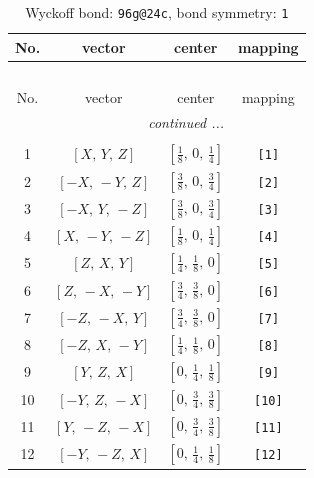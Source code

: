 \documentclass[fleqn,8pt]{jsarticle}
\begin{document}
\begin{longtable}{cccc}
\caption{Wyckoff bond: {\tt 96g@24c}, bond symmetry: {\tt 1}}
 \\
 \hline \hline
No. & vector & center & mapping \\ \hline \endfirsthead

\multicolumn{3}{l}{\tablename\ \thetable{}} \\
 \hline \hline
No. & vector & center & mapping \\ \hline \endhead

 \hline \hline
\multicolumn{3}{r}{\footnotesize\it continued ...} \\ \endfoot

 \hline \hline
\multicolumn{3}{r}{} \\ \endlastfoot

1 & $\left[ X,\, Y,\, Z \right]$ & $\left[ \frac{1}{8},\, 0,\, \frac{1}{4} \right]$ & {\tt [1]} \\ \hline
2 & $\left[ - X,\, - Y,\, Z \right]$ & $\left[ \frac{3}{8},\, 0,\, \frac{3}{4} \right]$ & {\tt [2]} \\ \hline
3 & $\left[ - X,\, Y,\, - Z \right]$ & $\left[ \frac{3}{8},\, 0,\, \frac{3}{4} \right]$ & {\tt [3]} \\ \hline
4 & $\left[ X,\, - Y,\, - Z \right]$ & $\left[ \frac{1}{8},\, 0,\, \frac{1}{4} \right]$ & {\tt [4]} \\ \hline
5 & $\left[ Z,\, X,\, Y \right]$ & $\left[ \frac{1}{4},\, \frac{1}{8},\, 0 \right]$ & {\tt [5]} \\ \hline
6 & $\left[ Z,\, - X,\, - Y \right]$ & $\left[ \frac{3}{4},\, \frac{3}{8},\, 0 \right]$ & {\tt [6]} \\ \hline
7 & $\left[ - Z,\, - X,\, Y \right]$ & $\left[ \frac{3}{4},\, \frac{3}{8},\, 0 \right]$ & {\tt [7]} \\ \hline
8 & $\left[ - Z,\, X,\, - Y \right]$ & $\left[ \frac{1}{4},\, \frac{1}{8},\, 0 \right]$ & {\tt [8]} \\ \hline
9 & $\left[ Y,\, Z,\, X \right]$ & $\left[ 0,\, \frac{1}{4},\, \frac{1}{8} \right]$ & {\tt [9]} \\ \hline
10 & $\left[ - Y,\, Z,\, - X \right]$ & $\left[ 0,\, \frac{3}{4},\, \frac{3}{8} \right]$ & {\tt [10]} \\ \hline
11 & $\left[ Y,\, - Z,\, - X \right]$ & $\left[ 0,\, \frac{3}{4},\, \frac{3}{8} \right]$ & {\tt [11]} \\ \hline
12 & $\left[ - Y,\, - Z,\, X \right]$ & $\left[ 0,\, \frac{1}{4},\, \frac{1}{8} \right]$ & {\tt [12]} \\ \hline

\end{longtable}
\end{document}
